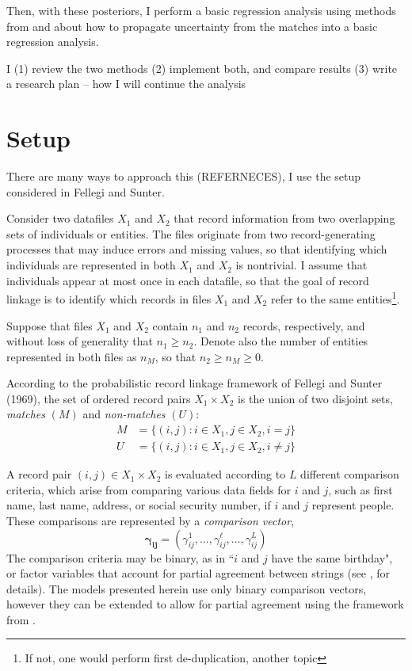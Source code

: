 \documentclass[11pt,reqno]{amsart}
\begin{document}
Then, with these posteriors, I perform a basic regression analysis using methods from \cite{lahiri_larsen_2005} and \cite{tancredi_liseo_2015} \cite{tancredi_liseo_2011} about how to propagate uncertainty from the matches into a basic regression analysis.   

I (1) review the two methods
(2) implement both, and compare results
(3) write a research plan -- how I will continue the analysis

\section{Setup}

There are many ways to approach this (REFERNECES), I use the setup considered in Fellegi and Sunter. 

Consider two datafiles $X_1$ and $X_2$ that record information from two overlapping sets of individuals or entities.  The files originate from two record-generating processes that may induce errors and missing values, so that identifying which individuals are represented in both $X_1$ and $X_2$ is nontrivial.  I assume that individuals appear at most once in each datafile, so that the goal of record linkage is to identify which records in files $X_1$ and $X_2$ refer to the same entities\footnote{If not, one would perform first de-duplication, another topic}.  

Suppose that files $X_1$ and $X_2$ contain $n_1$ and $n_2$ records, respectively, and without loss of generality that $n_1 \geq n_2$.  Denote also the number of entities represented in both files as $n_{M}$, so that $n_2\geq n_M \geq 0$. 

According to the probabilistic record linkage framework of Fellegi and Sunter (1969), the set of ordered record pairs $X_1 \times X_2$ is the union of two disjoint sets, \textit{matches} $(M)$ and \textit{non-matches} $(U)$:
\begin{align*} M &= \{(i,j): i\in X_1, j\in X_2, i=j\} \\ U &= \{(i,j): i\in X_1, j\in X_2, i\neq j\}\end{align*} 

A record pair $(i,j) \in X_1\times X_2$ is evaluated according to $L$ different comparison criteria, which arise from comparing various data fields for $i$ and $j$, such as first name, last name, address, or social security number, if $i$ and $j$ represent people.  These comparisons are represented by a \textit{comparison vector}, $$\mathbf{\gamma_{ij}}= (\gamma_{ij}^1, \dots, \gamma_{ij}^{\ell}, \dots, \gamma_{ij}^L)$$  The comparison criteria may be binary, as in ``$i$ and $j$ have the same birthday", or factor variables that account for partial agreement between strings (see \citealp{winkler90}, for details).  The models presented herein use only binary comparison vectors, however they can be extended to allow for partial agreement using the framework from \cite{sadinle_2017}.
\end{document}
